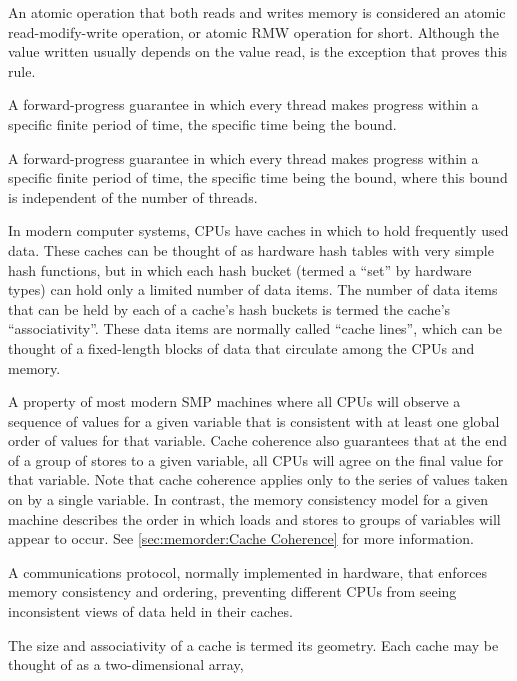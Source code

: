 \begin{description}
	An atomic operation that both reads and writes memory is
	considered an atomic read-modify-write operation, or atomic RMW
	operation for short.
	Although the value written usually depends on the value read,
	 is the exception that proves this rule.
\item[\IXGh{Bounded}{Wait Free}:]
	A forward-progress guarantee in which every thread makes
	progress within a specific finite period of time, the specific
	time being the bound.
\item[\IXGh{Bounded Population-Oblivious}{Wait Free}:]
	A forward-progress guarantee in which every thread makes
	progress within a specific finite period of time, the specific
	time being the bound, where this bound is independent of the
	number of threads.
\item[\IXG{Cache}:]
	In modern computer systems, CPUs have caches in which to hold
	frequently used data.
	These caches can be thought of as hardware hash tables with very
	simple hash functions,
	but in which each hash bucket (termed a ``set'' by hardware types)
	can hold only a limited number of data items.
	The number of data items that can be held by each of a cache's hash
	buckets is termed the cache's ``associativity''.
	These data items are normally called ``cache lines'', which
	can be thought of a fixed-length blocks of data that circulate
	among the CPUs and memory.
\item[\IXG{Cache Coherence}:]
	A property of most modern SMP machines where all CPUs will
	observe a sequence of values for a given variable that is
	consistent with at least one global order of values for
	that variable.
	Cache coherence also guarantees that at the end of a group
	of stores to a given variable, all CPUs will agree
	on the final value for that variable.
	Note that cache coherence applies only to the series of values
	taken on by a single variable.
	In contrast, the memory consistency model for a given machine
	describes the order in which loads and stores to groups of
	variables will appear to occur.
	See \cref{sec:memorder:Cache Coherence}
	for more information.
\item[\IXG{Cache-Coherence Protocol}:]
	A communications protocol, normally implemented in hardware,
	that enforces memory consistency and ordering, preventing
	different CPUs from seeing inconsistent views of data held
	in their caches.
\item[\IXG{Cache Geometry}:]
	The size and associativity of a cache is termed its geometry.
	Each cache may be thought of as a two-dimensional array,

\end{description}
